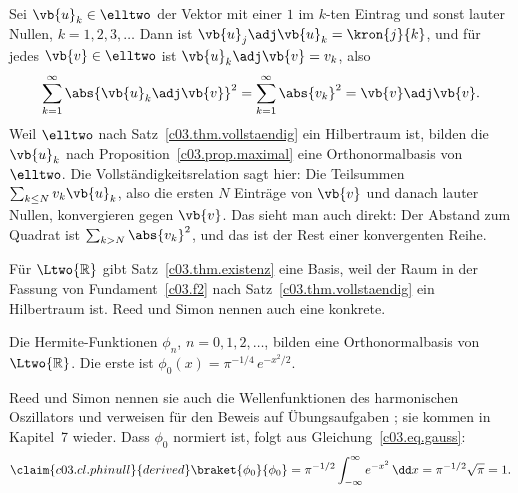 \begin{vertiefung}
  \begin{example}\label{c03.ex.elltwo-basis}
    Sei $\vb{u}_k \in \elltwo$ der Vektor mit einer $1$ im $k$-ten Eintrag und sonst lauter
    Nullen, $k = 1, 2, 3, \dots$ Dann ist $\vb{u}_j\adj\vb{u}_k = \kron{j}{k}$, und für jedes
    $\vb{v} \in \elltwo$ ist $\vb{u}_k\adj\vb{v} = v_k$, also
    \begin{equation}\label{c03.eq.elltwo-basis}
      \sum_{k=1}^{\infty} \abs{\vb{u}_k\adj\vb{v}}^2 = \sum_{k=1}^{\infty} \abs{v_k}^2 = \vb{v}\adj\vb{v} .
    \end{equation}
    Weil $\elltwo$ nach Satz~\ref{c03.thm.vollstaendig} ein Hilbertraum ist, bilden die
    $\vb{u}_k$ nach Proposition~\ref{c03.prop.maximal} eine Orthonormalbasis von $\elltwo$.
    Die Vollständigkeitsrelation sagt hier: Die Teilsummen $\sum_{k \leq N} v_k \vb{u}_k$, also
    die ersten $N$ Einträge von $\vb{v}$ und danach lauter Nullen, konvergieren gegen
    $\vb{v}$. Das sieht man auch direkt: Der Abstand zum Quadrat ist
    $\sum_{k > N} \abs{v_k}^2$, und das ist der Rest einer konvergenten Reihe.
  \end{example}

  Für $\Ltwo{\mathbb{R}}$ gibt Satz~\ref{c03.thm.existenz} eine Basis, weil der Raum in der
  Fassung von Fundament~\ref{c03.f2} nach Satz~\ref{c03.thm.vollstaendig} ein Hilbertraum ist. Reed und
  Simon nennen auch eine konkrete.

  \begin{theorem}\label{c03.thm.hermite}
    Die Hermite-Funktionen $\phi_n$, $n = 0, 1, 2, \dots$, bilden eine Orthonormalbasis von
    $\Ltwo{\mathbb{R}}$. Die erste ist $\phi_0(x) = \pi^{-1/4}\, e^{-x^2/2}$.
  \end{theorem}

  Reed und Simon nennen sie auch die Wellenfunktionen des harmonischen Oszillators und
  verweisen für den Beweis auf Übungsaufgaben ; sie kommen in
  Kapitel~7 wieder. Dass $\phi_0$ normiert ist, folgt aus Gleichung~\eqref{c03.eq.gauss}:
  \begin{equation}\label{c03.eq.phinull}\claim{c03.cl.phinull}{derived}
    \braket{\phi_0}{\phi_0} = \pi^{-1/2} \int_{-\infty}^{\infty} e^{-x^2}\, \dd x
    = \pi^{-1/2} \sqrt{\pi} = 1 .
  \end{equation}
\end{vertiefung}

